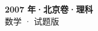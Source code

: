 \documentclass[zihao=-4, a4paper]{ctexart}
\begin{document}
\begin{center}
  {\Large\bfseries 2007 年·北京卷·理科}\\[4pt]
  {\large 数学 · 试题版}
\end{center}
\medskip
{}

\end{document}
